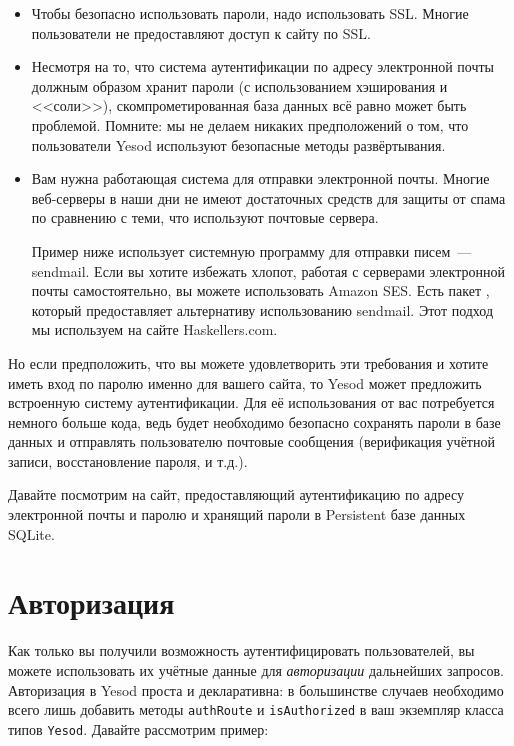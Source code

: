 \begin{itemize}
    \item Чтобы безопасно использовать пароли, надо использовать SSL. Многие пользователи не предоставляют доступ к сайту по SSL.

    \item Несмотря на то, что система аутентификации по адресу электронной почты должным образом хранит пароли (с использованием хэширования и <<соли>>), скомпрометированная база данных всё равно может быть проблемой. Помните: мы не делаем никаких предположений о том, что пользователи Yesod используют безопасные методы развёртывания.

    \item Вам нужна работающая система для отправки электронной почты. Многие веб-серверы в наши дни не имеют достаточных средств для защиты от спама по сравнению с теми, что используют почтовые сервера.

    \begin{remark}
    Пример ниже использует системную программу для отправки писем~--- sendmail. Если вы хотите избежать хлопот, работая с серверами электронной почты самостоятельно, вы можете использовать Amazon SES. Есть пакет , который предоставляет альтернативу использованию sendmail. Этот подход мы используем на сайте Haskellers.com.
    \end{remark}
\end{itemize}

Но если предположить, что вы можете удовлетворить эти требования и хотите иметь вход по паролю именно для вашего сайта, то Yesod может предложить встроенную систему аутентификации. Для её использования от вас потребуется немного больше кода, ведь будет необходимо безопасно сохранять пароли в базе данных и отправлять пользователю почтовые сообщения (верификация учётной записи, восстановление пароля, и т.д.).

Давайте посмотрим на сайт, предоставляющий аутентификацию по адресу электронной почты и паролю и хранящий пароли в Persistent базе данных SQLite.


\section{Авторизация}

Как только вы получили возможность аутентифицировать пользователей, вы можете использовать их учётные данные для \emph{авторизации} дальнейших запросов. Авторизация в Yesod проста и декларативна: в большинстве случаев необходимо всего лишь добавить методы \lstinline'authRoute' и \lstinline'isAuthorized' в ваш экземпляр класса типов \lstinline'Yesod'. Давайте рассмотрим пример:

